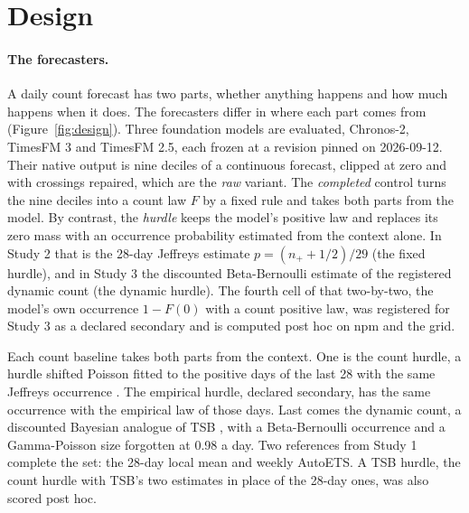 \providecommand{\lm}{\texttt{local\_mean\_28}}
\providecommand{\aets}{\texttt{autoets\_weekly}}
\providecommand{\qs}{QScore9}
\providecommand{\hc}{\texttt{hurdle\_count\_28}}

\section{Design}
\label{sec:design}

\paragraph{The forecasters.} A daily count forecast has two parts, whether anything happens and how much
happens when it does. The forecasters differ in where each part comes from (Figure~\ref{fig:design}). Three
foundation models are evaluated, Chronos-2, TimesFM 3 and TimesFM 2.5, each frozen at a revision pinned on
2026-09-12. Their native output is nine deciles of a continuous forecast, clipped at zero and with crossings
repaired, which are the \emph{raw} variant. The \emph{completed} control turns the nine deciles into a count
law $F$ by a fixed rule and takes both parts from the model. By contrast, the \emph{hurdle} keeps the model's
positive law and replaces its zero mass with an occurrence probability estimated from the context alone. In
Study 2 that is the 28-day Jeffreys estimate $p = (n_{+} + 1/2) / 29$ (the fixed hurdle), and in Study 3 the
discounted Beta-Bernoulli estimate of the registered dynamic count (the dynamic hurdle). The fourth cell of
that two-by-two, the model's own occurrence $1 - F(0)$ with a count positive law, was registered for Study 3
as a declared secondary and is computed post hoc on npm and the grid.

Each count baseline takes both parts from the context. One is the count hurdle, a hurdle shifted Poisson
fitted to the positive days of the last 28 with the same Jeffreys occurrence \citep{snyder2012}. The empirical
hurdle, declared secondary, has the same occurrence with the empirical law of those days. Last comes the
dynamic count, a discounted Bayesian analogue of TSB \citep{teunter2011}, with a Beta-Bernoulli occurrence and
a Gamma-Poisson size forgotten at 0.98 a day. Two references from Study 1 complete the set: the 28-day local
mean and weekly AutoETS. A TSB hurdle, the count hurdle with TSB's two estimates in place of the 28-day ones,
was also scored post hoc.

